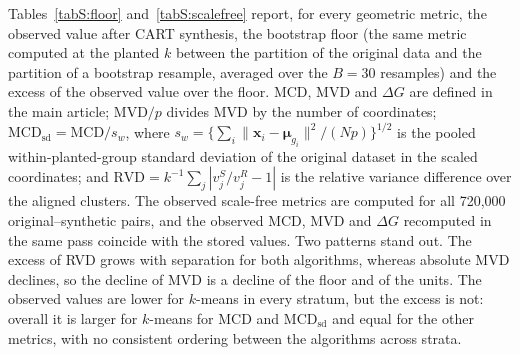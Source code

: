 \documentclass[pdflatex,referee]{sn-jnl}
\newcommand{\bx}{\mathbf{x}}
\newcommand{\bmu}{\boldsymbol{\mu}}
\begin{document}
Tables~\ref{tabS:floor} and~\ref{tabS:scalefree} report, for every geometric metric, the observed
value after CART synthesis, the bootstrap floor (the same metric computed at
the planted $k$ between the partition of the original data and the partition
of a bootstrap resample, averaged over the $B = 30$ resamples) and the excess
of the observed value over the floor. MCD, MVD and $\Delta G$ are defined in
the main article; $\mathrm{MVD}/p$ divides MVD by the number of coordinates;
$\mathrm{MCD}_{\mathrm{sd}} = \mathrm{MCD}/s_w$, where
$s_w = \{\sum_i \lVert \bx_i - \bmu_{g_i} \rVert^2 / (Np)\}^{1/2}$ is the
pooled within-planted-group standard deviation of the original dataset in the
scaled coordinates; and
$\mathrm{RVD} = k^{-1}\sum_j |v_j^S/v_j^R - 1|$ is the relative variance
difference over the aligned clusters. The observed scale-free metrics are
computed for all 720{,}000 original--synthetic pairs, and the observed MCD, MVD
and $\Delta G$ recomputed in the same pass coincide with the stored values.
Two patterns stand out. The excess of RVD grows with separation for both
algorithms, whereas absolute MVD declines, so the decline of MVD is a decline
of the floor and of the units. The observed values are lower for $k$-means in
every stratum, but the excess is not: overall it is larger for $k$-means for
MCD and $\mathrm{MCD}_{\mathrm{sd}}$ and equal for the other metrics, with no
consistent ordering between the algorithms across strata.

\begin{table}[!htbp]
\centering
\caption{Geometric floor by stratum for the metrics of the main article:
  observed value after CART synthesis (Obs.), bootstrap floor ($B = 30$) and
  excess (Obs.\ minus floor), averaged over the scenario means of each
  stratum, at the planted $k$. Strata: separation (36 scenarios each),
  distribution family (72 each) and dimensionality (48 each).}
\label{tabS:floor}
\footnotesize

\end{table}

\begin{table}[!htbp]
\centering
\caption{Scale-free metrics by stratum: MVD per coordinate ($\mathrm{MVD}/p$),
  centroid distance in within-component standard deviations
  ($\mathrm{MCD}_{\mathrm{sd}}$) and relative variance difference (RVD).
  Columns and strata as in Table~\ref{tabS:floor}. Observed values use all
  720{,}000 original--synthetic pairs.}
\label{tabS:scalefree}
\footnotesize

\end{table}
\end{document}
